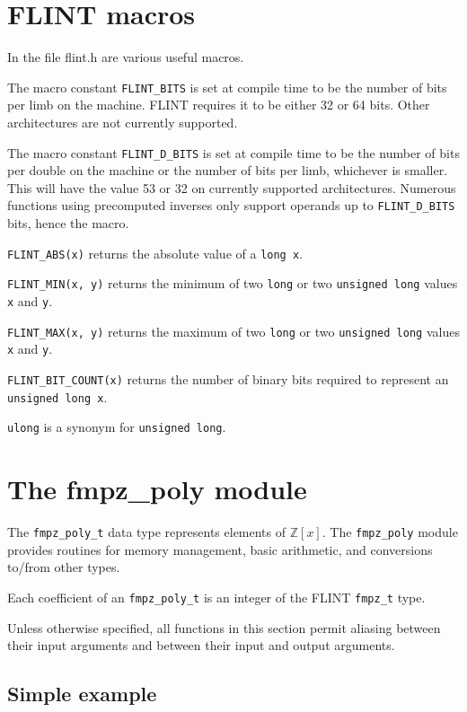 \documentclass[a4paper,10pt]{article}
\newcommand{\Z}{\mathbb{Z}}
\newcommand{\code}{\lstinline}
\begin{document}
\section{FLINT macros}
In the file flint.h are various useful macros.

The macro constant \code{FLINT_BITS} is set at compile time to be the number of bits per limb on the machine. FLINT requires it to be either 32 or 64 bits. Other architectures are not currently supported.

The macro constant \code{FLINT_D_BITS} is set at compile time to be the number of bits per double on the machine or the number of bits per limb, whichever is smaller. This will have the value 53 or 32 on currently supported architectures. Numerous functions using precomputed inverses only support operands up to \code{FLINT_D_BITS} bits, hence the macro.

\code{FLINT_ABS(x)} returns the absolute value of a \code{long x}.

\code{FLINT_MIN(x, y)} returns the minimum of two \code{long} or two \code{unsigned long} values \code{x} and \code{y}.

\code{FLINT_MAX(x, y)} returns the maximum of two \code{long} or two \code{unsigned long} values \code{x} and \code{y}.

\code{FLINT_BIT_COUNT(x)} returns the number of binary bits required to represent an \code{unsigned long x}.

\code{ulong} is a synonym for \code{unsigned long}.

\section{The fmpz\_poly module}

The \code{fmpz_poly_t} data type represents elements of $\Z[x]$. The \code{fmpz_poly} module provides routines for memory management, basic arithmetic, and conversions to/from other types.

Each coefficient of an \code{fmpz_poly_t} is an integer of the FLINT \code{fmpz_t} type. 

Unless otherwise specified, all functions in this section permit aliasing between their input arguments and between their input and output arguments. 

\subsection{Simple example}
\end{document}

